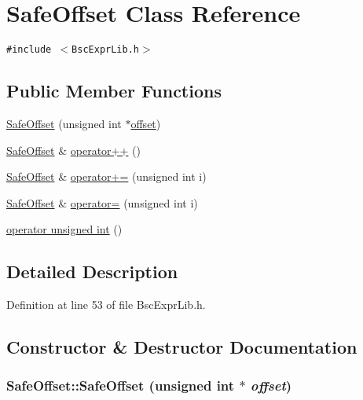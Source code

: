 \hypertarget{class_safe_offset}{
\section{SafeOffset Class Reference}
\label{class_safe_offset}
}
{\tt \#include $<$BscExprLib.h$>$}

\subsection*{Public Member Functions}
\begin{CompactItemize}
\item 
\hyperlink{class_safe_offset_dad0f7a948975f74e3cafe4ed0843dbd}{SafeOffset} (unsigned int $\ast$\hyperlink{glext__bak_8h_a782f3aea23e3c30029c811241dc2c82}{offset})
\item 
\hyperlink{class_safe_offset}{SafeOffset} \& \hyperlink{class_safe_offset_69d3d42a42aafbb45dfa01fa258e8c4a}{operator++} ()
\item 
\hyperlink{class_safe_offset}{SafeOffset} \& \hyperlink{class_safe_offset_b0cde26da028cc7671b5c7f6de59d390}{operator+=} (unsigned int i)
\item 
\hyperlink{class_safe_offset}{SafeOffset} \& \hyperlink{class_safe_offset_60468de7dceaf68aa7b675c9726933da}{operator=} (unsigned int i)
\item 
\hyperlink{class_safe_offset_4af35621921440301b85554ab0677e28}{operator unsigned int} ()
\end{CompactItemize}


\subsection{Detailed Description}


Definition at line 53 of file BscExprLib.h.

\subsection{Constructor \& Destructor Documentation}
\hypertarget{class_safe_offset_dad0f7a948975f74e3cafe4ed0843dbd}{
\subsubsection[{SafeOffset}]{\setlength{\rightskip}{0pt plus 5cm}SafeOffset::SafeOffset (unsigned int $\ast$ {\em offset})}}
\label{class_safe_offset_dad0f7a948975f74e3cafe4ed0843dbd}




